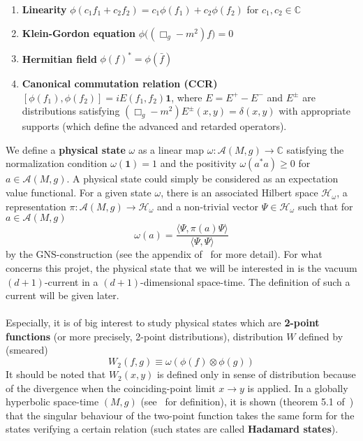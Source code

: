 \begin{enumerate}
\item \textbf{Linearity} $\phi(c_1 f_1 + c_2 f_2) = c_1 \phi(f_1) + c_2 \phi(f_2)$ for $c_1, c_2 \in \mathbb{C}$
%
\item \textbf{Klein-Gordon equation} $\phi\big( (\Box_g - m^2)f \big) = 0$
%
\item \textbf{Hermitian field} $\phi(f)^* = \phi(\bar{f})$
%
\item \textbf{Canonical commutation relation (CCR)} $[\phi(f_1), \phi(f_2)] = iE(f_1, f_2) \mathbf{1}$, where $E = E^+ - E^-$ and $E^\pm$ are distributions satisfying $(\Box_g - m^2)E^\pm(x,y) = \delta(x,y)$ with appropriate supports (which define the advanced and retarded operators).
\end{enumerate}
%
We define a \textbf{physical state} $\omega$ as a linear map
$\omega: \mathscr{A}(M,g) \rightarrow \mathbb{C}$ satisfying the normalization condition $\omega(\mathbf{1}) = 1$ and the positivity $\omega(a^*a) \geq 0$ for $a\in\mathscr{A}(M,g)$.
A physical state could simply be considered as an expectation value functional. 
For a given state $\omega$, there is an associated Hilbert space $\mathscr{H}_\omega$, a representation $\pi : \mathscr{A}(M,g)\rightarrow \mathscr{H}_\omega$ and a non-trivial vector $\Psi \in \mathscr{H}_\omega$ such that for $a \in \mathscr{A}(M,g)$
\begin{equation*}
\omega(a) = \frac{\langle \Psi, \pi(a)\Psi\rangle}{\langle \Psi, \Psi \rangle}
\end{equation*}
by the GNS-construction (see \eg the appendix of~\cite{Timmermann2008} for more detail).
For what concerns this projet, the physical state that we will be interested in is the vacuum $(d+1)$-current in a $(d+1)$-dimensional space-time.
The definition of such a current will be given later. \\\\
%
Especially, it is of big interest to study physical states which are \textbf{2-point functions} (or more precisely, 2-point distributions), 
\ie distribution $W$ defined by (smeared) 
\begin{equation*}
W_2(f, g ) \equiv \omega(\phi(f)\otimes \phi(g))
\end{equation*}
It should be noted that $W_2(x,y)$ is defined only in sense of distribution because of the divergence when the coinciding-point limit $x\rightarrow y$ is applied.
In a globally hyperbolic space-time $(M,g)$ (see~\cite{Wald2010} for definition), it is shown (theorem 5.1 of~\cite{Radzikowski1996}) that the singular behaviour of the two-point function takes the same form for the states verifying a certain relation (such states are called \textbf{Hadamard states}). 
